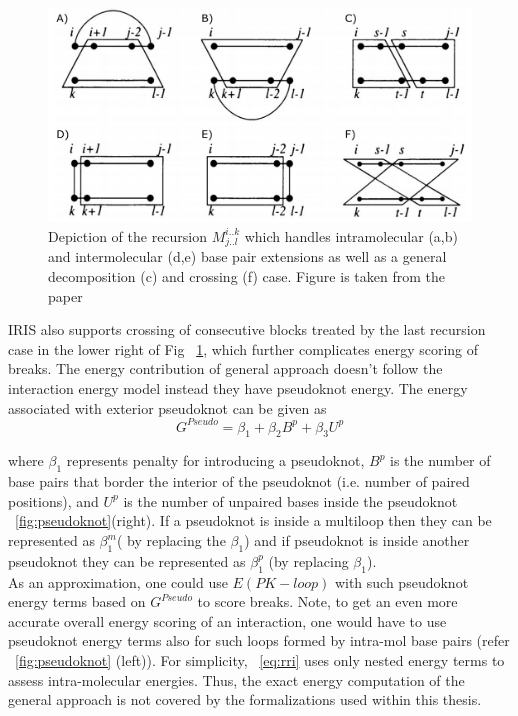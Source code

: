 \documentclass[twoside,a4paper]{report}
\begin{document}
	\begin{figure}[tb]
		\includegraphics[width=0.9\linewidth]{iris.pdf}
		\centering
		\caption{ Depiction of the recursion $M^{i..k}_{j..l}$  which
			handles intramolecular (a,b) and intermolecular (d,e) base pair extensions as well as a general decomposition (c) and crossing (f) case.  Figure is taken from the paper \citet{pervouchine2004iris}} 
		
		\label{fig:iris}
	\end{figure}
	
	IRIS also supports crossing of consecutive blocks treated by the last recursion case in the lower right of Fig ~\ref{fig:iris}, which further complicates energy scoring of breaks. The energy contribution of general approach doesn't follow the interaction energy model instead they have pseudoknot energy. The energy associated with exterior pseudoknot can be given as \citep{xu2015physics} \\
	
		\begin{equation}
		G^{Pseudo} = \beta_1 + \beta_2 B^p + \beta_3 U^p
		\end{equation}
		
	where $\beta_1$ represents penalty for introducing a pseudoknot, $B^p$ is the number of base pairs that border the interior of the pseudoknot (i.e. number of paired positions), and $U^p$ is the number of unpaired bases inside the pseudoknot ~\ref{fig:pseudoknot}(right). If a pseudoknot is inside a multiloop then they can be represented as $\beta_1^m$( by replacing the $\beta_1$) and if pseudoknot is inside another pseudoknot they can be  represented as $\beta_1^p$ (by replacing $\beta_1$).\\
	
	As an approximation, one could use $E(PK-loop)$ with such pseudoknot energy terms based on $G^{Pseudo}$ to score breaks. Note, to get an even more accurate overall energy scoring of an interaction, one would have to use pseudoknot energy terms also for such loops formed by intra-mol base pairs (refer ~\ref{fig:pseudoknot} (left)). For simplicity, ~\ref{eq:rri} uses only nested energy terms to assess intra-molecular energies. Thus, the exact energy computation of the general approach is not covered by the formalizations used within this thesis.\\
\end{document}
